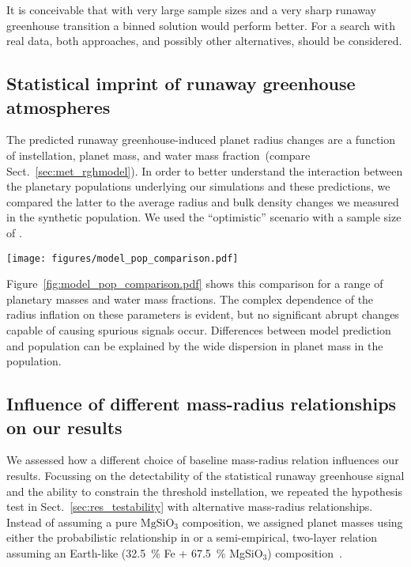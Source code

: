 \documentclass[twocolumn,twocolappendix]{aastex631}
\begin{document}
It is conceivable that with very large sample sizes and a very sharp runaway greenhouse transition a binned solution would perform better.
For a search with real data, both approaches, and possibly other alternatives, should be considered.

\subsection{Statistical imprint of runaway greenhouse atmospheres}\label{app:model-pop_comparison}
The predicted runaway greenhouse-induced planet radius changes are a function of instellation, planet mass, and water mass fraction~(compare Sect.~\ref{sec:met_rghmodel}).
In order to better understand the interaction between the planetary populations underlying our simulations and these predictions, we compared the latter to the average radius and bulk density changes we measured in the synthetic population.
We used the ``optimistic'' scenario with a sample size of .

\begin{figure*}[ht!]
    \begin{centering}
        \texttt{[image: figures/model\_pop\_comparison.pdf]}
        \caption{
        Comparison of radius and bulk density changes predicted by the atmospheric models to the average changes measured in the synthetic planet population.
        Model predictions $\Delta R_\mathrm{model}$ and $\Delta \rho_\mathrm{model}$ depend on individual planet masses; $\langle \Delta R_\mathrm{population} \rangle$ and $\langle \Delta \rho_\mathrm{population} \rangle$ are averaged measurements of the overall population.
        Significant differences are thus expected.
        }
        \label{fig:model_pop_comparison.pdf}
    \end{centering}
\end{figure*}
Figure~\ref{fig:model_pop_comparison.pdf} shows this comparison for a range of planetary masses and water mass fractions.
The complex dependence of the radius inflation on these parameters is evident, but no significant abrupt changes capable of causing spurious signals occur.
Differences between model prediction and population can be explained by the wide dispersion in planet mass in the population.



\subsection{Influence of different mass-radius relationships on our results}\label{app:MR_relation}
We assessed how a different choice of baseline mass-radius relation influences our results.
Focussing on the detectability of the statistical runaway greenhouse signal and the ability to constrain the threshold instellation, we repeated the hypothesis test in Sect.~\ref{sec:res_testability} with alternative mass-radius relationships.
Instead of assuming a pure $\mathrm{MgSiO_3}$ composition, we assigned planet masses using either the probabilistic relationship in \citet{Wolfgang2016} or a semi-empirical, two-layer relation assuming an Earth-like (\SI{32.5}{\percent} Fe + \SI{67.5}{\percent} MgSiO$_3$) composition~\citep{Zeng2016}.
\end{document}
